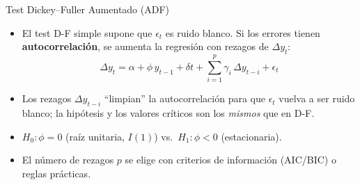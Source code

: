 \documentclass{beamer}
\begin{document}
\begin{frame}{Test Dickey--Fuller Aumentado (ADF)}

\begin{itemize}
  \item El test D-F simple supone que $\epsilon_t$ es ruido blanco. Si los errores tienen \textbf{autocorrelación}, se aumenta la regresión con rezagos de $\Delta y_t$:
  \[
  \Delta y_t = \alpha + \phi\, y_{t-1} + \delta t + \sum_{i=1}^{p} \gamma_i\, \Delta y_{t-i} + \epsilon_t
  \]
  \item Los rezagos $\Delta y_{t-i}$ ``limpian'' la autocorrelación para que $\epsilon_t$ vuelva a ser ruido blanco; la hipótesis y los valores críticos son los \emph{mismos} que en D-F.
  \item $H_0:\phi=0$ (raíz unitaria, $I(1)$) vs.\ $H_1:\phi<0$ (estacionaria).
  \item El número de rezagos $p$ se elige con criterios de información (AIC/BIC) o reglas prácticas.
\end{itemize}

\end{frame}
\end{document}
